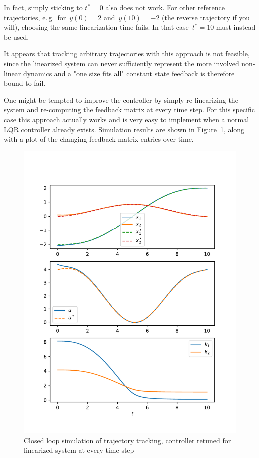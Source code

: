 \documentclass[a4paper,11pt,headinclude=true,headsepline,parskip=half,DIV=13]{scrartcl}
\begin{document}
In fact, simply sticking to $t^*=0$ also does not work.
For other reference trajectories, e.\,g.\ for~$y(0)=2$ and~$y(10)=-2$ (the reverse trajectory if you will), choosing the same linearization time fails.
In that case~$t^*=10$ must instead be used.

It appears that tracking arbitrary trajectories with this approach is not feasible, since the linearized system can never sufficiently represent the more involved non-linear dynamics and a "one size fits all" constant state feedback is therefore bound to fail.

One might be tempted to improve the controller by simply re-linearizing the system and re-computing the feedback matrix at every time step.
For this specific case this approach actually works and is very easy to implement when a normal LQR controller already exists.
Simulation results are shown in Figure~\ref{fig:fig2}, along with a plot of the changing feedback matrix entries over time.

\begin{figure}[ht]
    \centering
    \includegraphics[scale=1]{img/fig2.pdf}
    \caption{Closed loop simulation of trajectory tracking, controller retuned for linearized system at every time step}
    \label{fig:fig2}
\end{figure}
\end{document}
